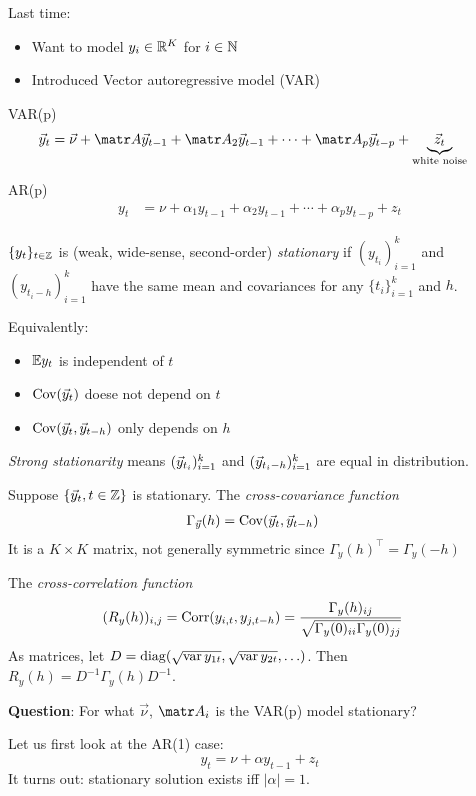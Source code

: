 
Last time:
\begin{itemize}
  \item Want to model $y_i \in \mathbb{R}^{K}$ for $i \in \mathbb{N}$
  \item Introduced Vector autoregressive  model (VAR)
\end{itemize}

VAR(p)
\begin{align}
  \vy_t &= \vec{\nu} + \mA \vy_{t-1} + \mA_2 \vy_{t-1}
  + \cdots + \mA_p \vy_{t-p} + \underbrace{\vz_t}_{\text{white noise}}
\end{align}

AR(p)
\begin{align}
  y_t &= \nu + \alpha_1 y_{t-1} + \alpha_2 y_{t-1}
  + \cdots + \alpha_p y_{t-p} + z_t
\end{align}

\begin{definition}
  $\{y_t\}_{t \in \mathbb{Z}}$ is (weak, wide-sense, second-order) \emph{stationary}
  if $(y_{t_i})_{i=1}^k$ and $(y_{t_i - h})_{i=1}^k$ have the same mean and
  covariances for any $\{t_i\}_{i=1}^k$ and $h$.
\end{definition}

Equivalently:
\begin{itemize}
  \item $\mathbb{E} y_t$ is independent of $t$
  \item $\operatorname{Cov}(\vec{y}_t)$ doese not depend on $t$
  \item $\operatorname{Cov}(\vec{y}_t, \vec{y}_{t-h})$ only depends on $h$
\end{itemize}

\begin{definition}
  \emph{Strong stationarity} means $(\vec{y}_{t_i})_{i=1}^k$
  and $(\vec{y}_{t_i - h})_{i=1}^k$ are equal in distribution.
\end{definition}

\begin{definition}
  Suppose $\{\vec{y}_t, t \in \mathbb{Z}\}$ is stationary.
  The \emph{cross-covariance function}
  \begin{align}
    \Gamma_{\vec{y}}(h) &= \operatorname{Cov}(\vec{y}_t, \vec{y}_{t-h})
  \end{align}
  It is a $K \times K$ matrix, not generally symmetric since
  $\Gamma_y(h)^\top = \Gamma_y (-h)$

  The \emph{cross-correlation function}
  \begin{align}
    (R_y(h))_{i,j}
    &= \operatorname{Corr}(y_{i,t}, y_{j,t-h})
    = \frac{\Gamma_y(h)_{ij}}{\sqrt{\Gamma_y(0)_{ii} \Gamma_y(0)_{jj}}}
  \end{align}
  As matrices, let $D = \operatorname{diag}(\sqrt{\operatorname{var} y_{1t}}, \sqrt{\operatorname{var} y_{2t}}, \ldots)$.
  Then $R_y(h) = D^{-1} \Gamma_y(h) D^{-1}$.
\end{definition}

\textbf{Question}: For what $\vec{\nu}$, $\mA_i$ is the VAR(p) model stationary?

Let us first look at the AR(1) case:
\[
  y_t
  = \nu + \alpha y_{t-1} + z_t
\]
It turns out: stationary solution exists iff $\lvert \alpha \rvert = 1$.


